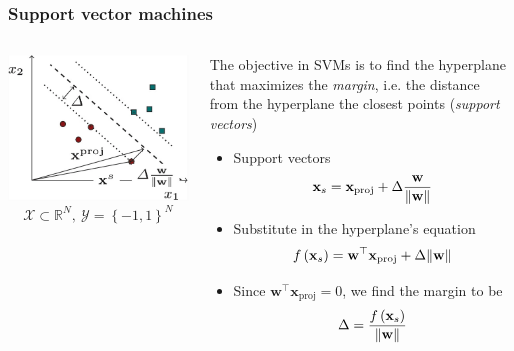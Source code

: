 \documentclass[aspectratio=43]{beamer}
\newcommand{\R}{\mathbb{R}}  %
\begin{document}
\begin{frame}
  \frametitle{Support vector machines}

  \begin{columns}[onlytextwidth]
    \begin{column}{.5\textwidth}
      \centering
      \includegraphics[width=\textwidth]{pics/supp-vecs.png}
      \[\mathcal{X} \subset \R^N,\: \mathcal{Y} = \left\{ -1,1 \right\}^N\]
    \end{column}
    \begin{column}{.5\textwidth}
      \small
      The objective in SVMs is to find the hyperplane that maximizes the \emph{margin}, i.e. the distance from the hyperplane the closest points (\emph{support vectors})
      \begin{itemize}
        \item Support vectors
        \[\mathbf{x}_s = \mathbf{x}_\mathrm{proj} + \Delta \frac{\mathbf{w}}{\norm{\mathbf{w}}}\]
        \item Substitute in the hyperplane's equation
        \[f\left( \mathbf{x}_s \right)=\mathbf{w}^\top\mathbf{x}_\mathrm{proj} + \Delta\norm{\mathbf{w}}\]
        \item Since $\mathbf{w}^\top\mathbf{x}_\mathrm{proj}=0$, we find the margin to be
        \[\Delta = \frac{f\left( \mathbf{x}_s \right)}{\norm{\mathbf{w}}}\]
      \end{itemize}
    \end{column}
\end{columns}

\end{frame}
\end{document}
